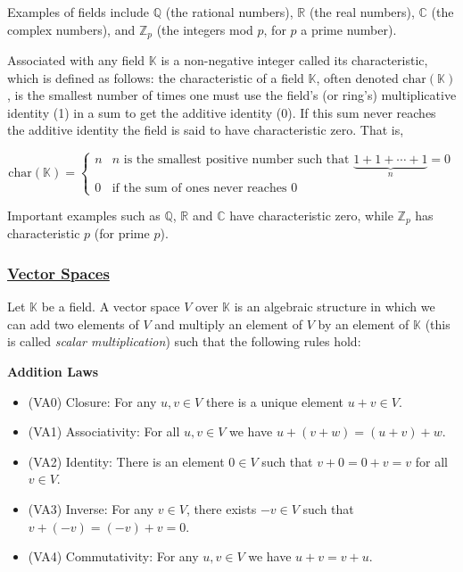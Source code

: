\documentclass{article}
\theoremstyle{definition}
\begin{document}
\bigskip
\noindent
Examples of fields include $\mathbb{Q}$ (the rational numbers),
$\mathbb{R}$ (the real numbers), $\mathbb{C}$ (the complex
numbers), and $\mathbb{Z}_{p}$ (the integers mod $p$, for $p$ a
prime number).

\bigskip
\noindent
Associated with any field $\mathbb{K}$ is a non-negative integer
called its characteristic, which is defined as follows: the
characteristic of a field $\mathbb{K}$, often denoted
$\text{char} (\mathbb{K})$, is the smallest number of times one
must use the field's (or ring's) multiplicative identity (1) in a
sum to get the additive identity (0). If this sum never reaches
the additive identity the field is said to have characteristic
zero. That is,

\bigskip
\begin{equation*}
\text{char}(\mathbb{K}) = 
    \begin{cases}
        n & \text{$n$ is the smallest positive number such that } 
              \underbrace{1+1+ \cdots + 1}_{n} = 0 \\
        0 & \text{if the sum of ones never reaches 0}
    \end{cases}
\end{equation*}

\bigskip
\noindent
Important examples such as $\mathbb{Q}$, $\mathbb{R}$ and
$\mathbb{C}$ have characteristic zero, while $\mathbb{Z}_{p}$ has
characteristic $p$ (for prime $p$).


\subsubsection*{\large \underline{Vector Spaces}}
Let $\mathbb{K}$ be a field. A vector space $V$ over $\mathbb{K}$
is an algebraic structure in which we can add two elements of $V$
and multiply an element of $V$ by an element of $\mathbb{K}$
(this is called \emph{scalar multiplication}) such that the
following rules hold:

\bigskip
{\bf Addition Laws}
\smallskip
\begin{itemize}
\item [] (VA0) Closure: For any $u,v \in V$ there is a unique element $u+v \in V$.
\item [] (VA1) Associativity: For all $u,v \in V$ we have $u+(v+w)=(u+v)+w$.
\item [] (VA2) Identity: There is an element $0 \in V$ such that $v+0=0+v=v$ for all $v \in V$. 
\item [] (VA3) Inverse: For any $v \in V$, there exists $-v \in V$ such that $v+(-v)=(-v)+v=0$.
\item [] (VA4) Commutativity: For any $u,v \in V$ we have $u+v=v+u$.
\end{itemize}
\end{document}
